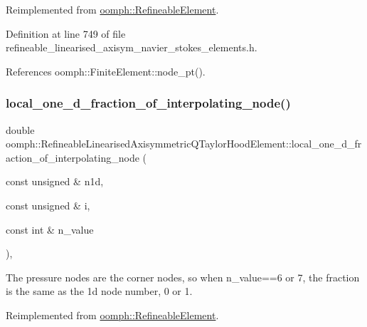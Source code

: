Reimplemented from \hyperlink{classoomph_1_1RefineableElement_ab27986fc2f6033a4758662cde78a7b76}{oomph\+::\+Refineable\+Element}.



Definition at line 749 of file refineable\+\_\+linearised\+\_\+axisym\+\_\+navier\+\_\+stokes\+\_\+elements.\+h.



References oomph\+::\+Finite\+Element\+::node\+\_\+pt().

\mbox{\label{classoomph_1_1RefineableLinearisedAxisymmetricQTaylorHoodElement_af8d1e9d112563638e422b679247993e8}} 
\subsubsection{\texorpdfstring{local\+\_\+one\+\_\+d\+\_\+fraction\+\_\+of\+\_\+interpolating\+\_\+node()}{local\_one\_d\_fraction\_of\_interpolating\_node()}}
{\footnotesize\ttfamily double oomph\+::\+Refineable\+Linearised\+Axisymmetric\+Q\+Taylor\+Hood\+Element\+::local\+\_\+one\+\_\+d\+\_\+fraction\+\_\+of\+\_\+interpolating\+\_\+node (\begin{DoxyParamCaption}\item[{const unsigned \&}]{n1d,  }\item[{const unsigned \&}]{i,  }\item[{const int \&}]{n\+\_\+value }\end{DoxyParamCaption})\hspace{0.3cm}{\ttfamily [inline]}, {\ttfamily [virtual]}}



The pressure nodes are the corner nodes, so when n\+\_\+value==6 or 7, the fraction is the same as the 1d node number, 0 or 1. 



Reimplemented from \hyperlink{classoomph_1_1RefineableElement_ac4e4ae5374154855ae9b072c6269f76e}{oomph\+::\+Refineable\+Element}.



